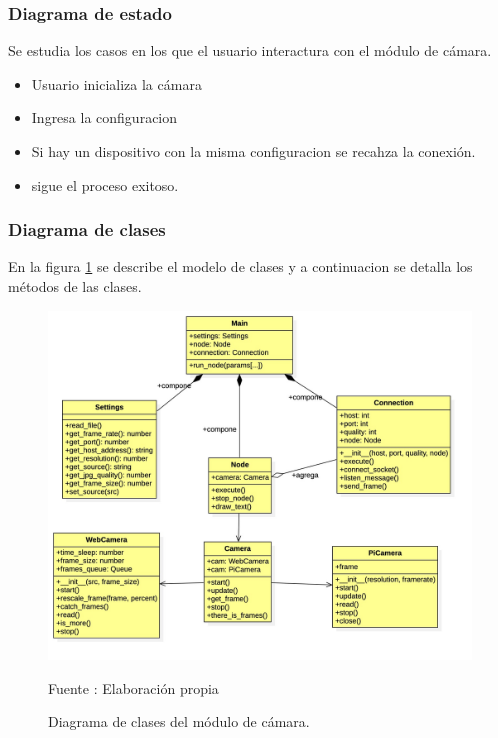\subsubsection{Diagrama de estado}
Se estudia los casos en los que el usuario interactura con el módulo de cámara.
\begin{itemize}
    \item Usuario inicializa la cámara
    \item Ingresa la configuracion
    \item Si hay un dispositivo con la misma configuracion se recahza la conexión.
    \item sigue el proceso exitoso.
\end{itemize}
\subsubsection{Diagrama de clases}

En la figura \ref{fig:camera_clases} se describe el modelo de clases y a continuacion se detalla los métodos de las clases.\\
\begin{figure}[H]
    \begin{center}
        \includegraphics[width=15cm]{img/capitulo_4/camera_clases.jpg}
        \caption{Diagrama de clases del módulo de cámara.}
        Fuente : Elaboración propia
        \label{fig:camera_clases}
    \end{center}
\end{figure}

